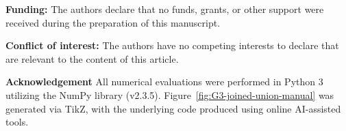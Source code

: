 \documentclass[12pt]{article}
\theoremstyle{definition}
\begin{document}
	\noindent \textbf{Funding:} The authors declare that no funds, grants, or other support were received during the preparation of this manuscript.
	
	\noindent \textbf{Conflict of interest:} The authors have no competing interests to declare that are relevant to the content of this article.
	
	
	\noindent\textbf{\large Acknowledgement}
	All numerical evaluations were performed in Python 3 utilizing the NumPy library (v2.3.5). Figure~\ref{fig:G3-joined-union-manual} was generated via TikZ, with the underlying code produced using online AI-assisted tools.
	
\end{document}
